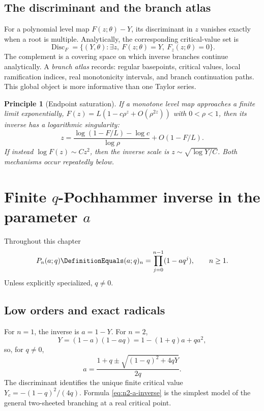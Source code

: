 \documentclass[11pt,a4paper,oneside,openany]{book}
\newtheorem{principle}[theorem]{Principle}
\theoremstyle{definition}
\theoremstyle{remark}
\newcommand{\Disc}{\operatorname{Disc}}
\begin{document}
\section{The discriminant and the branch atlas}

For a polynomial level map \(F(z;\theta)-Y\), its discriminant in \(z\)
vanishes exactly when a root is multiple.  Analytically, the corresponding
critical-value set is
\[
 \Disc_F=\{(Y,\theta):\exists z,\ F(z;\theta)=Y,\ F_z(z;\theta)=0\}.
\]
The complement is a covering space on which inverse branches continue
analytically.  A \emph{branch atlas} records: regular basepoints, critical
values, local ramification indices, real monotonicity intervals, and branch
continuation paths.  This global object is more informative than one Taylor
series.

\begin{principle}[Endpoint saturation]\label{pr:endpoint-saturation}
If a monotone level map approaches a finite limit exponentially,
\(F(z)=L(1-c\rho^z+O(\rho^{2z}))\) with \(0<\rho<1\), then its inverse has a
logarithmic singularity:
\[
 z=\frac{\log(1-F/L)-\log c}{\log\rho}+O(1-F/L).
\]
If instead \(\log F(z)\sim Cz^2\), then the inverse scale is
\(z\sim\sqrt{\log Y/C}\).  Both mechanisms occur repeatedly below.
\end{principle}

\chapter{Finite \texorpdfstring{$q$}{q}-Pochhammer inverse in the parameter \texorpdfstring{$a$}{a}}

Throughout this chapter
\[
 P_n(a;q)\DefinitionEquals(a;q)_n=\prod_{j=0}^{n-1}(1-aq^j),\qquad n\ge1.
\]
Unless explicitly specialized, \(q\ne0\).

\section{Low orders and exact radicals}

For \(n=1\), the inverse is \(a=1-Y\).  For \(n=2\),
\[
 Y=(1-a)(1-aq)=1-(1+q)a+qa^2,
\]
so, for \(q\ne0\),
\begin{equation}\label{eq:n2-a-inverse}
 a=\frac{1+q\pm\sqrt{(1-q)^2+4qY}}{2q}.
\end{equation}
The discriminant identifies the unique finite critical value
\(Y_c=-(1-q)^2/(4q)\).  Formula \eqref{eq:n2-a-inverse} is the simplest
model of the general two-sheeted branching at a real critical point.
\end{document}
